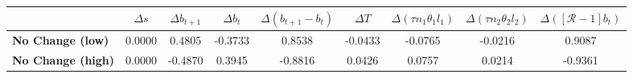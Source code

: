 \begin{tiny}\begin{tabular}{|l|c|c|c|c|c|c|c|c|}
\hline
&\textbf{$\Delta s$}&\textbf{$\Delta b_{t+1}$}&\textbf{$\Delta b_{t}$}&\textbf{$\Delta (b_{t+1}-b_t)$}&\textbf{$\Delta T$}&\textbf{$\Delta (\tau n_1\theta_1 l_1 )$}&\textbf{$\Delta (\tau n_2\theta_2 l_2)$}&\textbf{$\Delta ([\mathcal{R}-1]b_t)$}\\\hline
\textbf{No Change (low)}&0.0000&0.4805&-0.3733&0.8538&-0.0433&-0.0765&-0.0216&0.9087\\\hline
\textbf{No Change (high)}&0.0000&-0.4870&0.3945&-0.8816&0.0426&0.0757&0.0214&-0.9361\\\hline
\end{tabular}
\end{tiny}